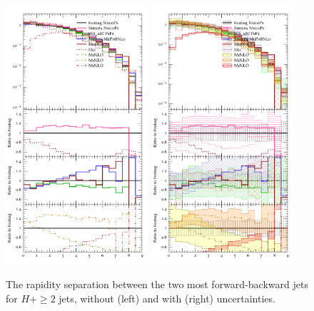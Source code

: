 \begin{figure}[t!]
  \centering
  \includegraphics[width=0.47\textwidth]{figures/hjetscomp_u_jjfb_dy.pdf}
  \hfill
  \includegraphics[width=0.47\textwidth]{figures/hjetscomp_jjfb_dy.pdf}
  \caption{
    The rapidity separation between the two most forward-backward jets
    for $H+\ge2$ jets, without (left) and with (right) uncertainties. 
    \label{fig:hjetscomp:results:2obs:dyjj_fb}
  }
\end{figure}

